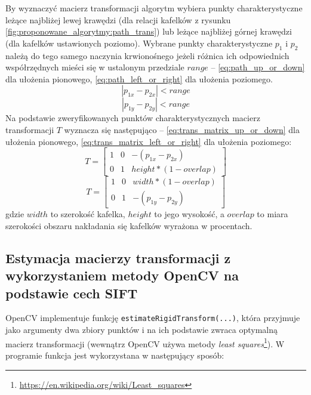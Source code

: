 By wyznaczyć macierz transformacji algorytm wybiera punkty charakterystyczne leżące najbliżej lewej krawędzi (dla relacji kafelków z rysunku \ref{fig:proponowane_algorytmy:path_trans}) lub leżące najbliżej górnej krawędzi (dla kafelków ustawionych poziomo). Wybrane punkty charakterystyczne $p_{1}$ i $p_{2}$ należą do tego samego naczynia krwionośnego jeżeli różnica ich odpowiednich współrzędnych mieści się w ustalonym przedziale $range$ -- \ref{eq:path_up_or_down} dla ułożenia pionowego, \ref{eq:path_left_or_right} dla ułożenia poziomego.
\begin{equation}
\left|p_{1x}- p_{2x}\right| < range
\label{eq:path_up_or_down}
\end{equation}
\begin{equation}
\left|p_{1y} - p_{2y}\right| < range
\label{eq:path_left_or_right}
\end{equation}
Na podstawie zweryfikowanych punktów charakterystycznych macierz transformacji $T$ wyznacza się następująco -- \ref{eq:trans_matrix_up_or_down} dla ułożenia pionowego, \ref{eq:trans_matrix_left_or_right} dla ułożenia poziomego:
\begin{equation}
T = \begin{bmatrix}
  1 & 0 & -(p_{1x} - p_{2x})\\
  0 & 1 & height * (1 - overlap)
\end{bmatrix}
\label{eq:trans_matrix_up_or_down}
\end{equation}
\begin{equation}
T = \begin{bmatrix}
  1 & 0 & width * (1 - overlap) \\
  0 & 1 & -(p_{1y} - p_{2y})
\end{bmatrix}
\label{eq:trans_matrix_left_or_right}
\end{equation}
gdzie $width$ to szerokość kafelka, $height$ to jego wysokość, a $overlap$ to miara szerokości obszaru nakładania się kafelków wyrażona w procentach.

\subsection{Estymacja macierzy transformacji z wykorzystaniem metody OpenCV na podstawie cech SIFT}
\label{sec:proponowane_algorytmy:rigid}

OpenCV implementuje funkcję \texttt{estimateRigidTransform(...)}, która przyjmuje jako argumenty dwa zbiory punktów i na ich podstawie zwraca optymalną macierz transformacji (wewnątrz OpenCV używa metody \textit{least squares}\footnote{\url{https://en.wikipedia.org/wiki/Least_squares}}). W programie funkcja jest wykorzystana w następujący sposób:

